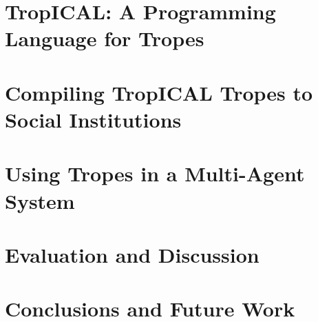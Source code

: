 \documentclass{article}
\begin{document}
\section{TropICAL: A Programming Language for Tropes}
\label{sec:tropical}

\section{Compiling TropICAL Tropes to Social Institutions}
\label{sec:instal}

\section{Using Tropes in a Multi-Agent System}
\label{sec:mas}

\section{Evaluation and Discussion}
\label{sec:evaluation}

\section{Conclusions and Future Work}
\label{sec:conclusions}




\end{document}
